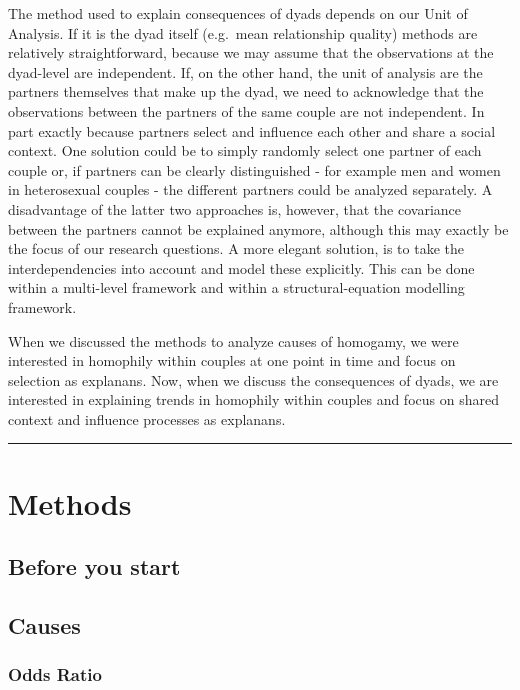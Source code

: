 \documentclass[
]{book}
\begin{document}
The method used to explain consequences of dyads depends on our Unit of Analysis. If it is the dyad itself (e.g.~mean relationship quality) methods are relatively straightforward, because we may assume that the observations at the dyad-level are independent. If, on the other hand, the unit of analysis are the partners themselves that make up the dyad, we need to acknowledge that the observations between the partners of the same couple are not independent. In part exactly because partners select and influence each other and share a social context. One solution could be to simply randomly select one partner of each couple or, if partners can be clearly distinguished - for example men and women in heterosexual couples - the different partners could be analyzed separately. A disadvantage of the latter two approaches is, however, that the covariance between the partners cannot be explained anymore, although this may exactly be the focus of our research questions. A more elegant solution, is to take the interdependencies into account and model these explicitly. This can be done within a multi-level framework and within a structural-equation modelling framework.

When we discussed the methods to analyze causes of homogamy, we were interested in homophily within couples at one point in time and focus on selection as explanans. Now, when we discuss the consequences of dyads, we are interested in explaining trends in homophily within couples and focus on shared context and influence processes as explanans.

\begin{center}\rule{0.5\linewidth}{0.5pt}\end{center}

\hypertarget{methods}{%
\chapter{Methods}\label{methods}}

\hypertarget{before-you-start}{%
\section{Before you start}\label{before-you-start}}

\hypertarget{causes}{%
\section{Causes}\label{causes}}

\hypertarget{odds-ratio}{%
\subsection{Odds Ratio}\label{odds-ratio}}
\end{document}
